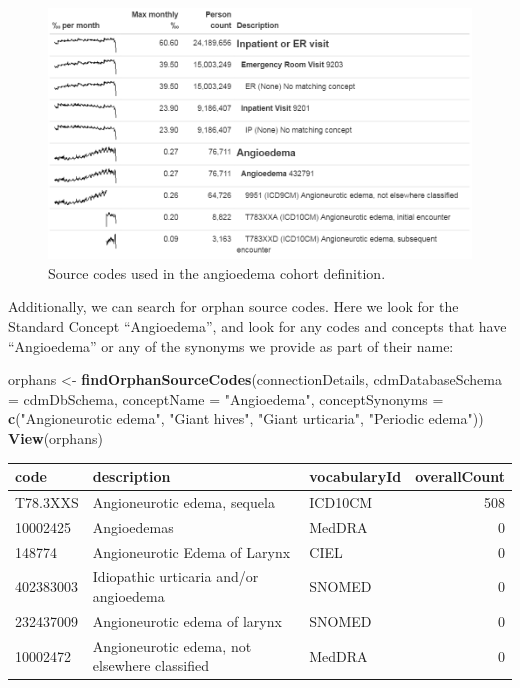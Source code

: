 \documentclass[11pt]{book}
\newenvironment{Shaded}{\begin{snugshade}}{\end{snugshade}}
\newcommand{\DataTypeTok}[1]{\textcolor[rgb]{0.13,0.29,0.53}{#1}}
\newcommand{\KeywordTok}[1]{\textcolor[rgb]{0.13,0.29,0.53}{\textbf{#1}}}
\newcommand{\NormalTok}[1]{#1}
\newcommand{\StringTok}[1]{\textcolor[rgb]{0.31,0.60,0.02}{#1}}
\theoremstyle{definition}
\theoremstyle{definition}
\theoremstyle{definition}
\theoremstyle{remark}
\begin{document}
\begin{figure}

{\centering \includegraphics[width=1\linewidth]{images/DataQuality/sourceCodesAngioedema} 

}

\caption{Source codes used in the angioedema cohort definition.}\label{fig:sourceCodesAngioedema}
\end{figure}

Additionally, we can search for orphan source codes. Here we look for the Standard Concept ``Angioedema'', and look for any codes and concepts that have ``Angioedema'' or any of the synonyms we provide as part of their name:

\begin{Shaded}
\begin{Highlighting}[]
\NormalTok{orphans <-}\StringTok{ }\KeywordTok{findOrphanSourceCodes}\NormalTok{(connectionDetails,}
                                 \DataTypeTok{cdmDatabaseSchema =}\NormalTok{ cdmDbSchema,}
                                 \DataTypeTok{conceptName =} \StringTok{"Angioedema"}\NormalTok{,}
                                 \DataTypeTok{conceptSynonyms =} \KeywordTok{c}\NormalTok{(}\StringTok{"Angioneurotic edema"}\NormalTok{,}
                                                     \StringTok{"Giant hives"}\NormalTok{,}
                                                     \StringTok{"Giant urticaria"}\NormalTok{,}
                                                     \StringTok{"Periodic edema"}\NormalTok{))}
\KeywordTok{View}\NormalTok{(orphans)}
\end{Highlighting}
\end{Shaded}

\begin{longtable}[]{@{}lllr@{}}
\toprule
code & description & vocabularyId & overallCount\tabularnewline
\midrule
\endhead
T78.3XXS & Angioneurotic edema, sequela & ICD10CM & 508\tabularnewline
10002425 & Angioedemas & MedDRA & 0\tabularnewline
148774 & Angioneurotic Edema of Larynx & CIEL & 0\tabularnewline
402383003 & Idiopathic urticaria and/or angioedema & SNOMED & 0\tabularnewline
232437009 & Angioneurotic edema of larynx & SNOMED & 0\tabularnewline
10002472 & Angioneurotic edema, not elsewhere classified & MedDRA & 0\tabularnewline
\bottomrule
\end{longtable}
\end{document}
